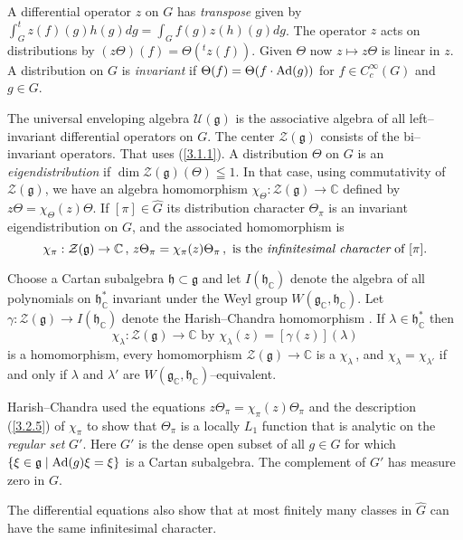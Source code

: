 \documentclass{conm-p-l}
\renewcommand{\gg}{\mathfrak{g}}
\def\gg{\mathfrak{g}}
\def\gh{\mathfrak{h}}
\def\Ad{{\rm Ad}}
\def\C{\mathbb{C}}
\def\cU{\mathcal{U}}
\def\cZ{\mathcal{Z}}
\begin{document}
A differential operator $z$ on $G$ has {\em transpose} given by
$\int_G ^tz(f)(g)h(g)dg = \int_G f(g)z(h)(g)dg$.  The operator $z$ acts on
distributions by $(z\Theta)(f) = \Theta(^tz(f))$.  Given $\Theta$ now
$z \mapsto z\Theta$ is linear in $z$.  A distribution on $G$ is
{\em invariant} if $\Theta(f) = \Theta(f\cdot \Ad(g))$ for $f \in C_c^\infty(G)$
and $g \in G$.

The universal enveloping algebra $\cU(\gg)$ is the associative algebra of
all left--invariant differential operators on $G$.  The center $\cZ(\gg)$
consists of the bi--invariant operators.  That uses (\ref{3.1.1}).  A
distribution $\Theta$ on $G$ is an {\em eigendistribution} if 
$\dim \cZ(\gg)(\Theta) \leqq 1$.  In that case, using commutativity of 
$\cZ(\gg)$, we have an algebra homomorphism $\chi_\Theta:\cZ(\gg) \to \C$
defined by $z\Theta = \chi_\Theta(z)\Theta$.  If $[\pi] \in \widehat{G}$
its distribution character $\Theta_\pi$ is an invariant eigendistribution
on $G$, and the associated homomorphism is
\begin{equation}\label{3.2.4}
\chi_\pi: \cZ(\gg) \to \C\,,\, z\Theta_\pi = \chi_\pi(z)\Theta_\pi\,,
\text{ is the {\em infinitesimal character} of } [\pi].
\end{equation}

Choose a Cartan subalgebra $\gh \subset \gg$ and let $I(\gh_\C)$ denote the 
algebra of all polynomials on $\gh_\C^*$ invariant under the Weyl group
$W(\gg_\C,\gh_\C)$.  Let $\gamma: \cZ(\gg) \to I(\gh_\C)$ denote the
Harish--Chandra homomorphism \cite{HC1956c}.  If $\lambda \in \gh_\C^*$
then
\begin{equation}\label{3.2.5}
\chi_\lambda: \cZ(\gg) \to \C \text{ by } 
	\chi_\lambda(z) = [\gamma(z)](\lambda)
\end{equation}
is a homomorphism, every homomorphism $\cZ(\gg) \to \C$ is a $\chi_\lambda$\,,
and $\chi_\lambda = \chi_{\lambda'}$ if and only if $\lambda$ and
$\lambda'$ are $W(\gg_\C,\gh_\C)$--equivalent.

Harish--Chandra \cite{HC1956c} used the equations 
$z\Theta_\pi = \chi_\pi(z)\Theta_\pi$ and the description (\ref{3.2.5})
of $\chi_\pi$ to show that $\Theta_\pi$ is a locally $L_1$ function that
is analytic on the {\em regular set} $G'$.  Here $G'$ is the dense open
subset of all $g \in G$ for which $\{\xi \in \gg \mid \Ad(g)\xi = \xi\}$
is a Cartan subalgebra.  The complement of $G'$ has measure zero in $G$.

The differential equations also show that at most finitely many classes 
in $\widehat{G}$ can have the same infinitesimal character.
\end{document}
